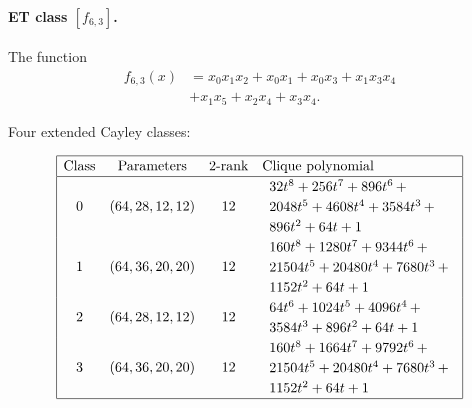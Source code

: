 \documentclass[12pt,a4paper]{article}
\begin{document}
\paragraph*{ET class $[f_{6,3}]$.}

The function
\begin{align*}
f_{6,3}(x) &= x_{0} x_{1} x_{2} + x_{0} x_{1} + x_{0} x_{3} + x_{1} x_{3} x_{4}
\\
           &+ x_{1} x_{5} + x_{2} x_{4} + x_{3} x_{4}.
\end{align*}

Four extended Cayley classes:

\small{}
\begin{align*}
\def\arraystretch{1.2}
\begin{array}{|cccl|}
\hline
\text{Class} &
\text{Parameters} &
\text{2-rank} &
\text{Clique polynomial}
\\
\hline
0 &
(64, 28, 12, 12) &
12 &
\begin{array}{l}
32t^{8} + 256t^{7} + 896t^{6}
\,+
\\
 2048t^{5} + 4608t^{4} + 3584t^{3}
\,+
\\
 896t^{2} + 64t + 1
\end{array}
\\
1 &
(64, 36, 20, 20) &
12 &
\begin{array}{l}
160t^{8} + 1280t^{7} + 9344t^{6}
\,+
\\
 21504t^{5} + 20480t^{4} + 7680t^{3}
\,+
\\
 1152t^{2} + 64t + 1
\end{array}
\\
2 &
(64, 28, 12, 12) &
12 &
\begin{array}{l}
64t^{6} + 1024t^{5} + 4096t^{4}
\,+
\\
 3584t^{3} + 896t^{2} + 64t + 1
\end{array}
\\
3 &
(64, 36, 20, 20) &
12 &
\begin{array}{l}
160t^{8} + 1664t^{7} + 9792t^{6}
\,+
\\
 21504t^{5} + 20480t^{4} + 7680t^{3}
\,+
\\
 1152t^{2} + 64t + 1
\end{array}
\\
\hline
\end{array}
\end{align*}
\end{document}
